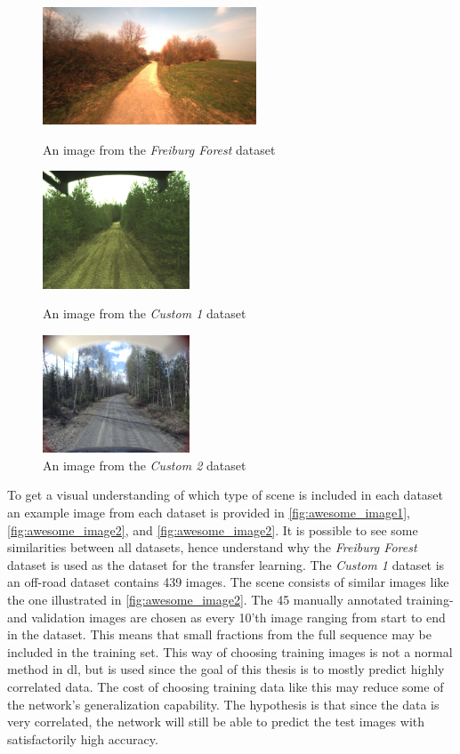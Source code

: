 \documentclass[USenglish]{ifimaster}  %
\begin{document}
\begin{figure}[ht]
  \includegraphics[width=\linewidth, height=3.5cm]{bilder/freiburg.png}
  \caption{An image from the \textit{Freiburg Forest} dataset}\label{fig:awesome_image1}
\endminipage\hfill
{}
  \includegraphics[width=\linewidth, height=3.5cm]{bilder/custom_1.png}
  \caption{An image from the \textit{Custom 1} dataset}\label{fig:awesome_image2}
\endminipage\hfill
{}%
  \includegraphics[width=\linewidth, height=3.5cm]{bilder/custom_2.png}
  \caption{An image from the \textit{Custom 2} dataset}\label{fig:awesome_image3}
\endminipage
\end{figure}

To get a visual understanding of which type of scene is included in each dataset an example image from each dataset is provided in \cref{fig:awesome_image1}, \cref{fig:awesome_image2}, and \cref{fig:awesome_image2}. It is possible to see some similarities between all datasets, hence understand why the \textit{Freiburg Forest} dataset is used as the dataset for the transfer learning. The \textit{Custom 1} dataset is an off-road dataset contains 439 images. The scene consists of similar images like the one illustrated in \cref{fig:awesome_image2}. The 45 manually annotated training- and validation images are chosen as every 10'th image ranging from start to end in the dataset. This means that small fractions from the full sequence may be included in the training set. This way of choosing training images is not a normal method in \ac{dl}, but is used since the goal of this thesis is to mostly predict highly correlated data. The cost of choosing training data like this may reduce some of the network's generalization capability. The hypothesis is that since the data is very correlated, the network will still be able to predict the test images with satisfactorily high accuracy. 
\end{document}
